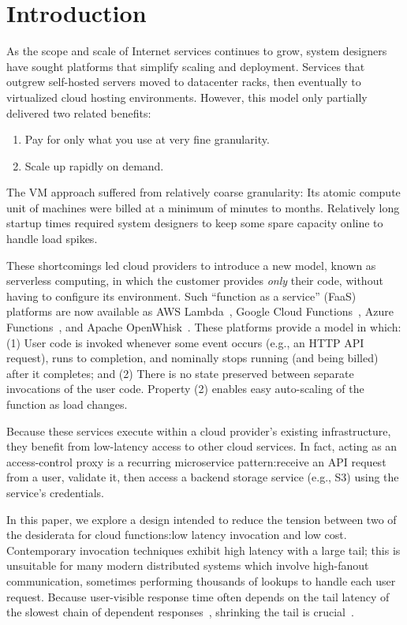 \section{Introduction}
\label{sec:intro}

As the scope and scale of Internet services continues to grow, system designers
have sought platforms that simplify scaling and deployment.
Services that outgrew self-hosted servers moved to datacenter racks, then
eventually to virtualized cloud hosting environments.
However, this model only partially delivered two related benefits:
\begin{enumerate}
\item Pay for only what you use at very fine granularity.
\item Scale up rapidly on demand.
\end{enumerate}

The VM approach suffered from relatively coarse granularity:  Its atomic compute unit
of machines were billed at a minimum of minutes to months.  Relatively long startup
times required system designers to keep some spare capacity online to handle load
spikes.

These shortcomings led cloud providers to introduce a new model, known as
serverless computing, in which the customer provides \textit{only} their code,
without having to configure its environment.   Such ``function as a service''
(FaaS) platforms are now available as AWS Lambda~\cite{www-amazon-lambda}, Google
Cloud Functions~\cite{www-google-cf}, Azure Functions~\cite{www-microsoft-af}, and
Apache OpenWhisk~\cite{www-apache-openwhisk}.  These platforms provide a model in
which: (1)  User code is invoked whenever some event occurs (e.g., an HTTP
API request), runs to completion, and nominally stops running (and being
billed) after it completes; and (2)  There is no state preserved between
separate invocations of the user code.  Property (2) enables easy auto-scaling
of the function as load changes.

Because these services execute within a cloud provider's existing
infrastructure, they benefit from low-latency access to other cloud
services.  In fact, acting as an access-control proxy is a recurring microservice
pattern:\@ receive an API request from a user, validate it, then access
a backend storage service (e.g., S3) using the service's credentials.

In this paper, we explore a design intended to reduce the tension between two of
the desiderata for cloud functions:\@ low latency invocation and low cost.  Contemporary
invocation techniques exhibit high latency with a
large tail; this is
unsuitable for many modern distributed systems which involve
high-fanout communication, sometimes performing thousands of
lookups to handle each user request.  Because user-visible response time often
depends on the tail latency of the slowest chain of dependent
responses~\cite{Dean:cacm2013}, shrinking the tail is crucial~\cite{Jalaparti:sigcomm2013,
Xu:nsdi2013,Li:socc2014,Jeon:asplos2016}.

